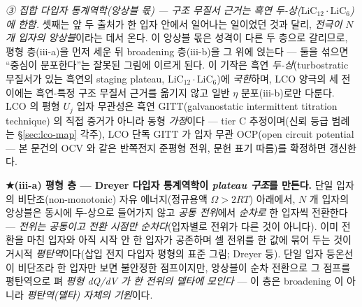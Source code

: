 \emph{③ 집합 다입자 통계역학(앙상블 몫) --- 구조 무질서 근거는 흑연 두-상($\mathrm{LiC_{12}}\cdot\mathrm{LiC_6}$)에 한함.} 셋째는 앞 두 출처가
한 입자 안에서 일어나는 일이었던 것과 달리, \emph{전극이 $N$ 개 입자의 앙상블}이라는 데서 온다. 이 앙상블 몫은 성격이
다른 두 층으로 갈리므로, 평형 층(iii-a)을 먼저 세운 뒤 broadening 층(iii-b)을 그 위에 얹는다 --- 둘을 섞으면 ``중심이
분포한다''는 잘못된 그림에 이르게 된다. 이 기작은 흑연 \emph{두-상}(turbostratic 무질서가 있는 흑연의 staging
plateau, $\mathrm{LiC_{12}}\cdot\mathrm{LiC_6}$)에 \emph{국한}하며, LCO 양극의 세 전이에는 흑연-특정 구조 무질서
근거를 옮기지 않고 일반 $\eta$ 분포(iii-b)로만 다룬다. LCO 의 평형 $U_j$ 입자 무관성은 흑연
GITT(galvanostatic intermittent titration technique)\cite{park2021} 의 직접 증거가 아니라 동형
\emph{가정}이다 --- tier C 추정이며(신뢰 등급 범례는 \S\ref{sec:lco-map} 각주), LCO 단독 GITT 가 입자
무관 OCP(open circuit potential --- 본 문건의 OCV 와 같은 반쪽전지 준평형 전위, 문헌 표기 따름)를
확정하면 갱신한다.

\textbf{★(iii-a) 평형 층 --- Dreyer 다입자 통계역학이 \emph{plateau 구조}를 만든다.} 단일 입자의 비단조(non-monotonic) 자유
에너지(정규용액 $\Omega>2RT$) 아래에서, $N$ 개 입자의 앙상블은 동시에 두-상으로 들어가지 않고 \emph{공통 전위}에서
\emph{순차로} 한 입자씩 전환한다 --- \emph{전위는 공통이고 전환 시점만 순차다}(입자별로 전위가 다른 것이 아니다). 이미
전환을 마친 입자와 아직 시작 안 한 입자가 공존하며 셀 전위를 한 값에 묶어 두는
것이 거시적 \emph{평탄역}이다(삽입 전지 다입자 평형의 표준 그림; Dreyer 등\cite{dreyer2010}).
단일 입자 등온선이 비단조라 한 입자만 보면 불안정한 점프이지만, 앙상블이 순차 전환으로 그 점프를
평탄역으로 펴 \emph{평형 dQ/dV 가 한 전위의 델타에 모인다} --- 이 층은 broadening 이 아니라 \emph{평탄역(델타) 자체의 기원}이다.


